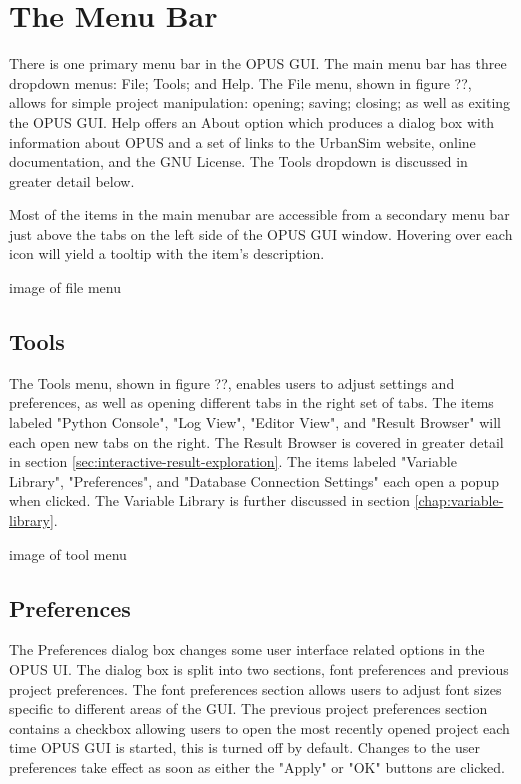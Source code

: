 \chapter{The Menu Bar}

There is one primary menu bar in the OPUS GUI.  The main menu bar has three dropdown menus: File; Tools; and Help.  The File menu, shown in figure ??, allows for simple project manipulation: opening; saving; closing; as well as exiting the OPUS GUI.  Help offers an About option which produces a dialog box with information about OPUS and a set of links to the UrbanSim website, online documentation, and the GNU License.  The Tools dropdown is discussed in greater detail below.

Most of the items in the main menubar are accessible from a secondary menu bar just above the tabs on the left side of the OPUS GUI window.  Hovering over each icon will yield a tooltip with the item's description.

image of file menu

\section{Tools}

The Tools menu, shown in figure ??, enables users to adjust settings and preferences, as well as opening different tabs in the right set of tabs.  The items labeled "Python Console", "Log View", "Editor View", and "Result Browser" will each open new tabs on the right.  The Result Browser is covered in greater detail in section \ref{sec:interactive-result-exploration}.  The items labeled "Variable Library", "Preferences", and "Database Connection Settings" each open a popup when clicked.  The Variable Library is further discussed in section \ref{chap:variable-library}.

image of tool menu

\section{Preferences}

The Preferences dialog box changes some user interface related options in the OPUS UI.  The dialog box is split into two sections, font preferences and previous project preferences.  The font preferences section allows users to adjust font sizes specific to different areas of the GUI.  The previous project preferences section contains a checkbox allowing users to open the most recently opened project each time OPUS GUI is started, this is turned off by default.  Changes to the user preferences take effect as soon as either the "Apply" or "OK" buttons are clicked.

